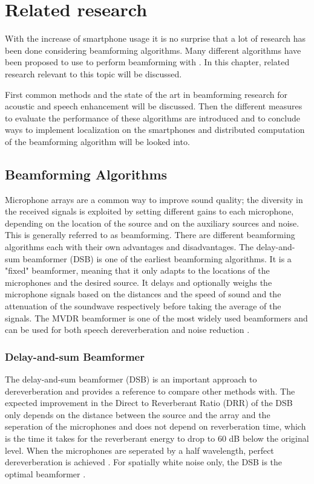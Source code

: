 \chapter{Related research}
\label{chap:related}
With the increase of smartphone usage it is no surprise that a lot of research has been done considering beamforming algorithms. Many different algorithms have been proposed to use to perform beamforming with \cite{vanveen1988, griffiths1982, krim1996}. In this chapter, related research relevant to this topic will be discussed.

First common methods and the state of the art in beamforming research for acoustic and speech enhancement will be discussed. Then the different measures to evaluate the performance of these algorithms are introduced and to conclude ways to implement localization on the smartphones and distributed computation of the beamforming algorithm will be looked into.

\section{Beamforming Algorithms}
\label{sec:rel_beamformers}

Microphone arrays are a common way to improve sound quality; the diversity in the received signals is exploited by setting different gains to each microphone, depending on the location of the source and on the auxiliary sources and noise. This is generally referred to as beamforming. There are different beamforming algorithms each with their own advantages and disadvantages. The delay-and-sum beamformer (DSB) is one of the earliest beamforming algorithms. It is a "fixed" beamformer, meaning that it only adapts to the locations of the microphones and the desired source. It delays and optionally weighs the microphone signals based on the distances and the speed of sound and the attenuation of the soundwave respectively before taking the average of the signals. The MVDR beamformer is one of the most widely used beamformers and can be used for both speech dereverberation and noise reduction \cite{naylor2010speech}.

\subsection{Delay-and-sum Beamformer}
The delay-and-sum beamformer (DSB) is an important approach to dereverberation and provides a reference to compare other methods with. The expected improvement in the Direct to Reverberant Ratio (DRR) of the DSB only depends on the distance between the source and  the array and the seperation of the microphones and does not depend on reverberation time, which is the time it takes for the reverberant energy to drop to 60 dB below the original level. When the microphones are seperated by a half wavelength, perfect dereverberation is achieved \cite{naylor2010speech}. For spatially white noise only, the DSB is the optimal beamformer \cite{brandstein2001}.

